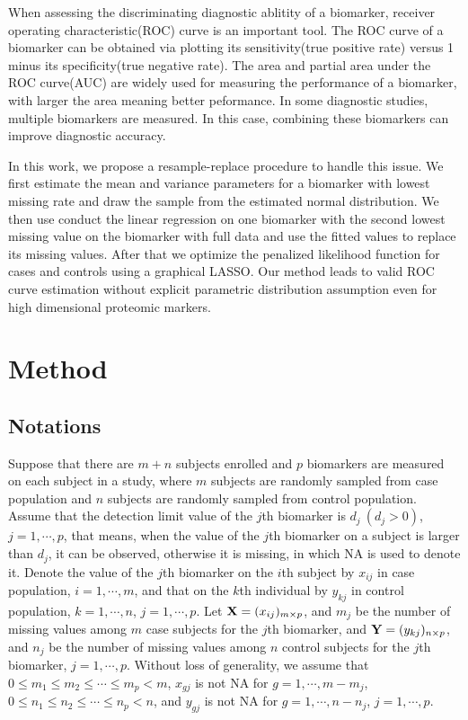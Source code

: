 \documentclass[a4,11pt,epsf, amssymb]{article}
\begin{document}
When assessing the discriminating diagnostic ablitity of a biomarker, receiver operating characteristic(ROC) curve is an important tool. The ROC curve of a biomarker can be obtained via plotting its sensitivity(true positive rate) versus 1 minus
its specificity(true negative rate). The area and partial area under the ROC curve(AUC) are widely used for measuring the performance of a biomarker, with larger the area meaning better peformance. In some diagnostic studies, multiple biomarkers are measured. In this case, combining these biomarkers can improve diagnostic accuracy.

In this work, we propose a resample-replace procedure to handle this issue. We first  estimate the mean and variance parameters for a biomarker with lowest missing rate and draw the sample from the estimated normal distribution. We then use conduct the linear regression on one biomarker with the second lowest missing value on the biomarker with full data and use the fitted values to replace its missing values. After that we optimize the penalized likelihood function for cases and controls using a graphical LASSO.
Our method leads to valid
ROC curve estimation without explicit parametric distribution assumption even for high dimensional proteomic markers.

\section{Method}

\subsection{Notations}
Suppose  that there are $m+n$ subjects enrolled and $p$ biomarkers are measured on each subject in a study, where $m$ subjects are randomly sampled from case population and $n$ subjects are randomly sampled from control population.
Assume that the detection limit value of the $j$th biomarker is $d_j~(d_j>0)$, $j=1,\cdots,p$, that means, when the value of the $j$th biomarker on a subject is larger than $d_j$, it can be observed, otherwise it is missing, in which NA is used to denote it.
Denote the value of the $j$th biomarker on the $i$th subject by $x_{ij}$ in case population, $i=1,\cdots,m$, and that on the $k$th individual by $y_{kj}$ in control population, $k=1,\cdots,n$, $j=1,\cdots,p$.
Let ${\bf X}=(x_{ij})_{m\times p}$, and $m_j$ be the number of missing values  among $m$ case subjects for the $j$th biomarker, and ${\bf Y}=(y_{kj})_{n\times p}$, and $n_j$ be the number of missing values  among  $n$ control subjects  for the $j$th biomarker, $j=1,\cdots,p$. Without loss of generality, we assume that $0\leq m_1\leq m_2\leq \cdots\leq m_p<m$,
$x_{gj}$ is not NA  for $g=1,\cdots,m-m_j$, $0\leq n_1\leq n_2\leq \cdots\leq n_p<n$,
and  $y_{gj}$ is not NA  for $g=1,\cdots,n-n_j$, $j=1,\cdots,p$.
\end{document}
